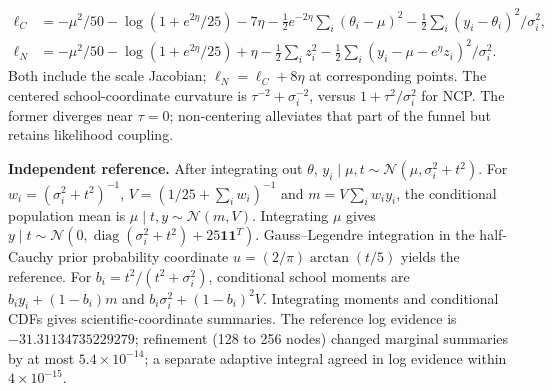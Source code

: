 \documentclass[11pt,a4paper]{article}
\newcommand{\diag}{\operatorname{diag}}
\begin{document}
\begin{align*}
\ell_C&=-\mu^2/50-\log(1+e^{2\eta}/25)-7\eta
-\tfrac12 e^{-2\eta}\sum_i(\theta_i-\mu)^2
-\tfrac12\sum_i (y_i-\theta_i)^2/\sigma_i^2,\\
\ell_N&=-\mu^2/50-\log(1+e^{2\eta}/25)+\eta
-\tfrac12\sum_i z_i^2
-\tfrac12\sum_i(y_i-\mu-e^\eta z_i)^2/\sigma_i^2.
\end{align*}
Both include the scale Jacobian; $\ell_N=\ell_C+8\eta$ at corresponding points. The centered school-coordinate curvature is $\tau^{-2}+\sigma_i^{-2}$, versus $1+\tau^2/\sigma_i^2$ for NCP. The former diverges near $\tau=0$; non-centering alleviates that part of the funnel but retains likelihood coupling.

\textbf{Independent reference.} After integrating out $\theta$, $y_i\mid\mu,t\sim\mathcal N(\mu,\sigma_i^2+t^2)$. For $w_i=(\sigma_i^2+t^2)^{-1}$, $V=(1/25+\sum_i w_i)^{-1}$ and $m=V\sum_iw_i y_i$, the conditional population mean is $\mu\mid t,y\sim\mathcal N(m,V)$. Integrating $\mu$ gives $y\mid t\sim\mathcal N(0,\diag(\sigma_i^2+t^2)+25\mathbf1\mathbf1^T)$. Gauss--Legendre integration in the half-Cauchy prior probability coordinate $u=(2/\pi)\arctan(t/5)$ yields the reference. For $b_i=t^2/(t^2+\sigma_i^2)$, conditional school moments are $b_i y_i+(1-b_i)m$ and $b_i\sigma_i^2+(1-b_i)^2V$. Integrating moments and conditional CDFs gives scientific-coordinate summaries. The reference log evidence is $-31.31134735229279$; refinement (128 to 256 nodes) changed marginal summaries by at most $5.4\times10^{-14}$; a separate adaptive integral agreed in log evidence within $4\times10^{-15}$.
\end{document}
